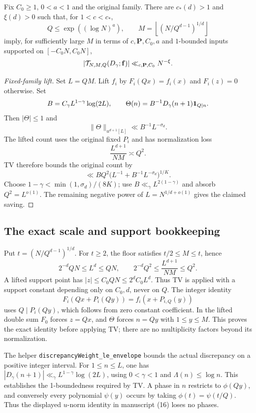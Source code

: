 \begin{proposition}\label{p:comparison}
\leanok
Fix $C_0\geq1$, $0<a<1$ and the original family. There are $c_*(d)>1$ and $\xi(d)>0$ such that, for $1<c<c_*$,
\[
 Q\leq\exp((\log N)^a),\qquad
 M=\left\lfloor(N/Q^{d-1})^{1/d}\right\rfloor
\]
imply, for sufficiently large $M$ in terms of $c,\mathbf P,C_0,a$ and $1$-bounded inputs supported on $[-C_0N,C_0N]$,
\[
 |\mathcal T_{N,M,Q}(D_\gamma;\mathbf f)|\ll_{c,\mathbf P,C_0}N^{-\xi}.
\]
\end{proposition}
\begin{proof}[Fixed-family lift]
\leanok
Set $L=QM$. Lift $f_i$ by $F_i(Qx)=f_i(x)$ and $F_i(z)=0$ otherwise. Set
\[
 B=C_\gamma L^{1-\gamma}\log(2L),\qquad
 \Theta(n)=B^{-1}D_\gamma(n+1)\mathbf 1_{Q\mid n}.
\]
Then $|\Theta|\leq1$ and
\[
 \|\Theta\|_{u^{d+1}[L]}\ll B^{-1}L^{-\sigma_d}.
\]
The lifted count uses the original fixed $P_i$ and has normalization loss
\[
 \frac{L^{d+1}}{NM}\asymp Q^2.
\]
TV therefore bounds the original count by
\[
 \ll BQ^2\bigl(L^{-1}+B^{-1}L^{-\sigma_d}\bigr)^{1/K}.
\]
Choose $1-\gamma<\min(1,\sigma_d)/(8K)$; use $B\ll_\gamma L^{2(1-\gamma)}$ and absorb $Q^2=L^{o(1)}$. The remaining negative power of $L=N^{1/d+o(1)}$ gives the claimed saving.
\end{proof}
\ifDetailed
\subsection*{The exact scale and support bookkeeping}
Put $t=(N/Q^{d-1})^{1/d}$. For $t\geq2$, the floor satisfies $t/2\leq M\leq t$, hence
\[
 2^{-d}QN\leq L^d\leq QN,\qquad
 2^{-d}Q^2\leq\frac{L^{d+1}}{NM}\leq Q^2.
\]
A lifted support point has $|z|\leq C_0QN\leq2^dC_0L^d$. Thus TV is applied with a support constant depending only on $C_0,d$, never on $Q$. The integer identity
\[
 F_i(Qx+P_i(Qy))=f_i(x+P_{i,Q}(y))
\]
uses $Q\mid P_i(Qy)$, which follows from zero constant coefficient. In the lifted double sum $F_0$ forces $z=Qx$, and $\Theta$ forces $n=Qy$ with $1\leq y\leq M$. This proves the exact identity before applying TV; there are no multiplicity factors beyond its normalization.

The helper \texttt{discrepancyWeight\_\allowbreak{}le\_\allowbreak{}envelope} bounds the actual discrepancy on a positive integer interval. For $1\leq n\leq L$, one has $|D_\gamma(n+1)|\ll_\gamma L^{1-\gamma}\log(2L)$, using $0<\gamma<1$ and $\Lambda(n)\leq\log n$. This establishes the 1-boundedness required by TV. A phase in $n$ restricts to $\phi(Qy)$, and conversely every polynomial $\psi(y)$ occurs by taking $\phi(t)=\psi(t/Q)$. Thus the displayed $u$-norm identity in manuscript (16) loses no phases.

